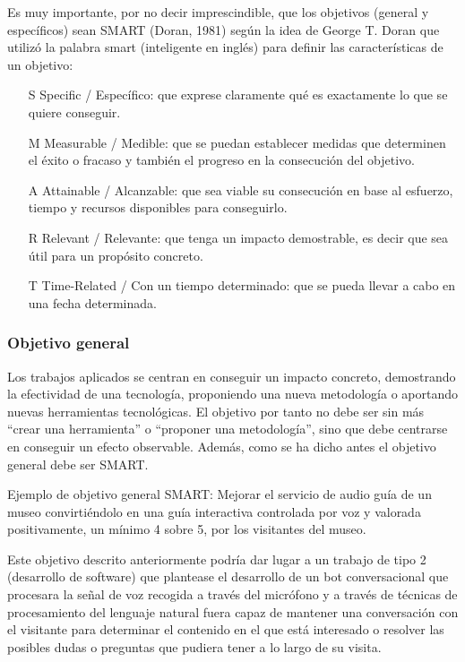 Es muy importante, por no decir imprescindible, que los objetivos (general y específicos) sean SMART (Doran, 1981) según la idea de George T. Doran que utilizó la palabra smart (inteligente en inglés) para definir las características de un objetivo:
\begin{itemize}
	\item[S] Specific / Específico: que exprese claramente qué es exactamente lo que se quiere conseguir.
	\item[M] Measurable / Medible: que se puedan establecer medidas que determinen el éxito o fracaso y también el progreso en la consecución del objetivo.
	\item[A] Attainable / Alcanzable: que sea viable su consecución en base al esfuerzo, tiempo y recursos disponibles para conseguirlo.
	\item[R] Relevant / Relevante: que tenga un impacto demostrable, es decir que sea útil para un propósito concreto.
	\item[T] Time-Related / Con un tiempo determinado: que se pueda llevar a cabo en una fecha determinada.
\end{itemize}

\subsubsection{Objetivo general}

Los trabajos aplicados se centran en conseguir un impacto concreto, demostrando la efectividad de una tecnología, proponiendo una nueva metodología o aportando nuevas herramientas tecnológicas. El objetivo por tanto no debe ser sin más “crear una herramienta” o “proponer una metodología”, sino que debe centrarse en conseguir un efecto observable. Además, como se ha dicho antes el objetivo general debe ser SMART.

Ejemplo de objetivo general SMART: Mejorar el servicio de audio guía de un museo convirtiéndolo en una guía interactiva controlada por voz y valorada positivamente, un mínimo 4 sobre 5, por los visitantes del museo.

Este objetivo descrito anteriormente podría dar lugar a un trabajo de tipo 2 (desarrollo de software) que plantease el desarrollo de un bot conversacional que procesara la señal de voz recogida a través del micrófono y a través de técnicas de procesamiento del lenguaje natural fuera capaz de mantener una conversación con el visitante para determinar el contenido en el que está interesado o resolver las posibles dudas o preguntas que pudiera tener a lo largo de su visita.

